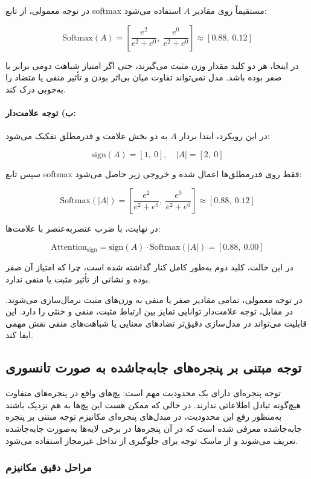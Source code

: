 در توجه معمولی، از تابع softmax مستقیماً روی مقادیر $A$ استفاده می‌شود:

\[
\text{Softmax}(A) =
\left[
\frac{e^2}{e^2 + e^0},\
\frac{e^0}{e^2 + e^0}
\right]
\approx [0.88,\ 0.12]
\]

در اینجا، هر دو کلید مقدار وزن مثبت می‌گیرند، حتی اگر امتیاز شباهت دومی برابر با صفر بوده باشد. مدل نمی‌تواند تفاوت میان بی‌اثر بودن و تأثیر منفی یا متضاد را به‌خوبی درک کند.

\paragraph{ب) توجه علامت‌دار:}

در این رویکرد، ابتدا بردار $A$ به دو بخش علامت و قدرمطلق تفکیک می‌شود:

\[
\text{sign}(A) = [1,\ 0], \quad
|A| = [2,\ 0]
\]

سپس تابع softmax فقط روی قدرمطلق‌ها اعمال شده و خروجی زیر حاصل می‌شود:

\[
\text{Softmax}(|A|) =
\left[
\frac{e^2}{e^2 + e^0},\
\frac{e^0}{e^2 + e^0}
\right]
\approx [0.88,\ 0.12]
\]

در نهایت، با ضرب عنصر‌به‌عنصر با علامت‌ها:

\[
\text{Attention}_{\text{sign}} =
\text{sign}(A) \cdot \text{Softmax}(|A|) = [0.88,\ 0.00]
\]

در این حالت، کلید دوم به‌طور کامل کنار گذاشته شده است، چرا که امتیاز آن صفر بوده و نشانی از تأثیر مثبت یا منفی ندارد.

در توجه معمولی، تمامی مقادیر صفر یا منفی به وزن‌های مثبت نرمال‌سازی می‌شوند. در مقابل، توجه علامت‌دار توانایی تمایز بین ارتباط مثبت، منفی و خنثی را دارد. این قابلیت می‌تواند در مدل‌سازی دقیق‌تر تضادهای معنایی یا شباهت‌های منفی نقش مهمی ایفا کند.

\subsection{توجه مبتنی بر پنجره‌های جابه‌جاشده به صورت تانسوری}

توجه پنجره‌ای دارای یک محدودیت مهم است: پچ‌های واقع در پنجره‌های متفاوت هیچ‌گونه تبادل اطلاعاتی ندارند.
در حالی که ممکن هست این پچ‌ها به هم نزدیک باشند به‌منظور رفع این محدودیت، در مبدل‌های پنجره‌ای مکانیزم توجه مبتنی بر پنجره جابه‌جاشده معرفی شده است که در آن پنجره‌ها در برخی لایه‌ها به‌صورت جابه‌جاشده تعریف می‌شوند و از ماسک توجه برای جلوگیری از تداخل غیرمجاز استفاده می‌شود.

\subsubsection*{مراحل دقیق مکانیزم }

